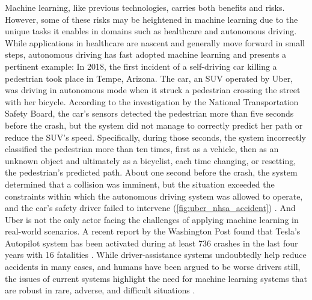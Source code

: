 Machine learning, like previous technologies, carries both benefits and risks. 
However, some of these risks may be heightened in machine learning due to the unique tasks it enables in domains such as healthcare and autonomous driving. 
While applications in healthcare are nascent and generally move forward in small steps, autonomous driving has fast adopted machine learning and presents a pertinent example: 
In 2018, the first incident of a self-driving car killing a pedestrian took place in Tempe, Arizona. 
The car, an SUV operated by Uber, was driving in autonomous mode when it struck a pedestrian crossing the street with her bicycle. 
According to the investigation by the National Transportation Safety Board, the car's sensors detected the pedestrian more than five seconds before the crash, but the system did not manage to correctly predict her path or reduce the SUV's speed. 
Specifically, during those seconds, the system incorrectly classified the pedestrian more than ten times, first as a vehicle, then as an unknown object and ultimately as a bicyclist, each time changing, or resetting, the pedestrian's predicted path. 
About one second before the crash, the system determined that a collision was imminent, but the situation exceeded the constraints within which the autonomous driving system was allowed to operate, and the car's safety driver failed to intervene (\cref{fig:uber_nhsa_accident}) \parencite{nationaltransportationsafetyboardnhsa_collision_2019}. 
%
And Uber is not the only actor facing the challenges of applying machine learning in real-world scenarios. A recent report by the Washington Post found that Tesla's Autopilot system has been activated during at least 736 crashes in the last four years with 16 fatalities \parencite{siddiqui_17_2023}. 
While driver-assistance systems undoubtedly help reduce accidents in many cases, and humans have been argued to be worse drivers still, the issues of current systems highlight the need for machine learning systems that are robust in rare, adverse, and difficult situations \parencite{metz_how_2022}. 

